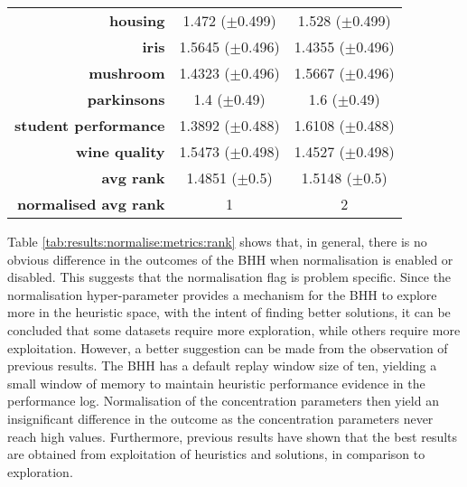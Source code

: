 \begin{table}[htb]
{\begin{tabular}{rcc}
                  \multicolumn{1}{r|}{\textbf{housing}}             & \cellcolor[rgb]{ .388,  .745,  .482}1.472 ($\pm$0.499)    & \cellcolor[rgb]{ .973,  .412,  .42}1.528 ($\pm$0.499)   \\
                  \multicolumn{1}{r|}{\textbf{iris}}                & \cellcolor[rgb]{ .973,  .412,  .42}1.5645 ($\pm$0.496)    & \cellcolor[rgb]{ .388,  .745,  .482}1.4355 ($\pm$0.496) \\
                  \multicolumn{1}{r|}{\textbf{mushroom}}            & \cellcolor[rgb]{ .388,  .745,  .482}1.4323 ($\pm$0.496)   & \cellcolor[rgb]{ .973,  .412,  .42}1.5667 ($\pm$0.496)  \\
                  \multicolumn{1}{r|}{\textbf{parkinsons}}          & \cellcolor[rgb]{ .388,  .745,  .482}1.4 ($\pm$0.49)       & \cellcolor[rgb]{ .973,  .412,  .42}1.6 ($\pm$0.49)      \\
                  \multicolumn{1}{r|}{\textbf{student performance}} & \cellcolor[rgb]{ .388,  .745,  .482}1.3892 ($\pm$0.488)   & \cellcolor[rgb]{ .973,  .412,  .42}1.6108 ($\pm$0.488)  \\
                  \multicolumn{1}{r|}{\textbf{wine quality}}        & \cellcolor[rgb]{ .973,  .412,  .42}1.5473 ($\pm$0.498)    & \cellcolor[rgb]{ .388,  .745,  .482}1.4527 ($\pm$0.498) \\
                  \midrule
                  \multicolumn{1}{r|}{\textbf{avg rank}}            & \cellcolor[rgb]{ .388,  .745,  .482}1.4851 ($\pm$0.5)     & \cellcolor[rgb]{ .973,  .412,  .42}1.5148 ($\pm$0.5)    \\
                  \midrule
                  \textbf{normalised avg rank}                      & \cellcolor[rgb]{ .388,  .745,  .482}1                     & \cellcolor[rgb]{ .973,  .412,  .42}2                    \\
            \end{tabular}%

      }
\end{table}%

Table \ref{tab:results:normalise:metrics:rank} shows that, in general, there is no obvious difference in the outcomes of the \acs{BHH} when normalisation is enabled or disabled. This suggests that the normalisation flag is problem specific. Since the normalisation hyper-parameter provides a mechanism for the \acs{BHH} to explore more in the heuristic space, with the intent of finding better solutions, it can be concluded that some datasets require more exploration, while others require more exploitation. However, a better suggestion can be made from the observation of previous results. The \acs{BHH} has a default replay window size of ten, yielding a small window of memory to maintain heuristic performance evidence in the performance log. Normalisation of the concentration parameters then yield an insignificant difference in the outcome as the concentration parameters never reach high values. Furthermore, previous results have shown that the best results are obtained from exploitation of heuristics and solutions, in comparison to exploration.

